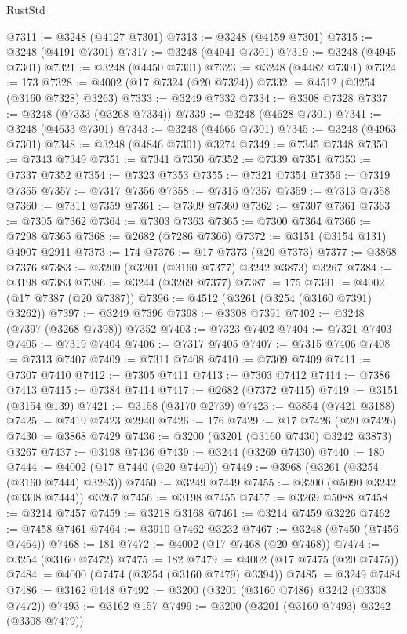 \begin{lexlean}{RustStd}
\begin{coremodule}
@7311 := @3248 (@4127 @7301)
@7313 := @3248 (@4159 @7301)
@7315 := @3248 (@4191 @7301)
@7317 := @3248 (@4941 @7301)
@7319 := @3248 (@4945 @7301)
@7321 := @3248 (@4450 @7301)
@7323 := @3248 (@4482 @7301)
@7324 := 173
@7328 := @4002 (@17 @7324 (@20 @7324))
@7332 := @4512 (@3254 (@3160 @7328) @3263)
@7333 := @3249 @7332
@7334 := @3308 @7328
@7337 := @3248 (@7333 (@3268 @7334))
@7339 := @3248 (@4628 @7301)
@7341 := @3248 (@4633 @7301)
@7343 := @3248 (@4666 @7301)
@7345 := @3248 (@4963 @7301)
@7348 := @3248 (@4846 @7301) @3274
@7349 := @7345 @7348
@7350 := @7343 @7349
@7351 := @7341 @7350
@7352 := @7339 @7351
@7353 := @7337 @7352
@7354 := @7323 @7353
@7355 := @7321 @7354
@7356 := @7319 @7355
@7357 := @7317 @7356
@7358 := @7315 @7357
@7359 := @7313 @7358
@7360 := @7311 @7359
@7361 := @7309 @7360
@7362 := @7307 @7361
@7363 := @7305 @7362
@7364 := @7303 @7363
@7365 := @7300 @7364
@7366 := @7298 @7365
@7368 := @2682 (@7286 @7366)
@7372 := @3151 (@3154 @131) @4907 @2911
@7373 := 174
@7376 := @17 @7373 (@20 @7373)
@7377 := @3868 @7376
@7383 := @3200 (@3201 (@3160 @7377) @3242 @3873) @3267
@7384 := @3198 @7383
@7386 := @3244 (@3269 @7377)
@7387 := 175
@7391 := @4002 (@17 @7387 (@20 @7387))
@7396 := @4512 (@3261 (@3254 (@3160 @7391) @3262))
@7397 := @3249 @7396
@7398 := @3308 @7391
@7402 := @3248 (@7397 (@3268 @7398)) @7352
@7403 := @7323 @7402
@7404 := @7321 @7403
@7405 := @7319 @7404
@7406 := @7317 @7405
@7407 := @7315 @7406
@7408 := @7313 @7407
@7409 := @7311 @7408
@7410 := @7309 @7409
@7411 := @7307 @7410
@7412 := @7305 @7411
@7413 := @7303 @7412
@7414 := @7386 @7413
@7415 := @7384 @7414
@7417 := @2682 (@7372 @7415)
@7419 := @3151 (@3154 @139)
@7421 := @3158 (@3170 @2739)
@7423 := @3854 (@7421 @3188)
@7425 := @7419 @7423 @2940
@7426 := 176
@7429 := @17 @7426 (@20 @7426)
@7430 := @3868 @7429
@7436 := @3200 (@3201 (@3160 @7430) @3242 @3873) @3267
@7437 := @3198 @7436
@7439 := @3244 (@3269 @7430)
@7440 := 180
@7444 := @4002 (@17 @7440 (@20 @7440))
@7449 := @3968 (@3261 (@3254 (@3160 @7444) @3263))
@7450 := @3249 @7449
@7455 := @3200 (@5090 @3242 (@3308 @7444)) @3267
@7456 := @3198 @7455
@7457 := @3269 @5088
@7458 := @3214 @7457
@7459 := @3218 @3168
@7461 := @3214 @7459 @3226
@7462 := @7458 @7461
@7464 := @3910 @7462 @3232
@7467 := @3248 (@7450 (@7456 @7464))
@7468 := 181
@7472 := @4002 (@17 @7468 (@20 @7468))
@7474 := @3254 (@3160 @7472)
@7475 := 182
@7479 := @4002 (@17 @7475 (@20 @7475))
@7484 := @4000 (@7474 (@3254 (@3160 @7479) @3394))
@7485 := @3249 @7484
@7486 := @3162 @148
@7492 := @3200 (@3201 (@3160 @7486) @3242 (@3308 @7472))
@7493 := @3162 @157
@7499 := @3200 (@3201 (@3160 @7493) @3242 (@3308 @7479))

\end{coremodule}
\end{lexlean}
